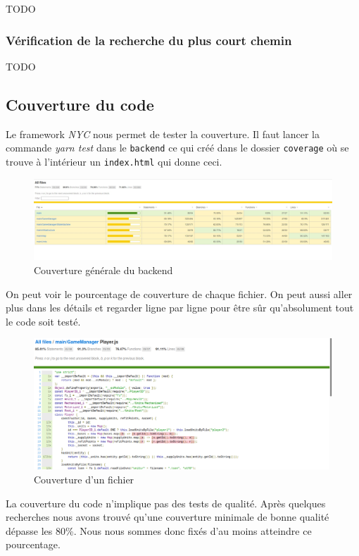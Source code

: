 TODO

\subsubsection{Vérification de la recherche du plus court chemin}

TODO

\subsection{Couverture du code}

Le framework \emph{NYC} nous permet de tester la couverture. Il faut lancer la commande \emph{yarn test} dans le \lstinline{backend} ce qui créé dans le dossier \lstinline{coverage} où se trouve à l'intérieur un \lstinline{index.html} qui donne ceci.

\begin{figure}[H]
    \centering
    \includegraphics[scale=0.35]{data/couverture_test_1.jpg}
    \caption{Couverture générale du backend}
\end{figure}

On peut voir le pourcentage de couverture de chaque fichier. On peut aussi aller plus dans les détails et regarder ligne par ligne pour être sûr qu'absolument tout le code soit testé.

\begin{figure}[H]
    \centering
    \includegraphics[scale=0.3]{data/couverture_test_2.png}
    \caption{Couverture d'un fichier}
\end{figure}

La couverture du code n'implique pas des tests de qualité. Après quelques recherches nous avons trouvé qu'une couverture minimale de bonne qualité dépasse les 80\%. Nous nous sommes donc fixés d'au moins atteindre ce pourcentage.